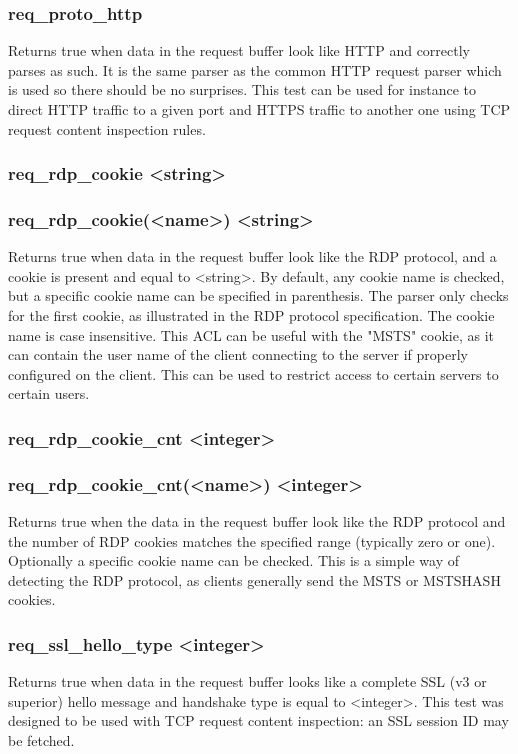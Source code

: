 \subsubsection{req\_proto\_http}
  Returns true when data in the request buffer look like HTTP and correctly
  parses as such. It is the same parser as the common HTTP request parser which
  is used so there should be no surprises. This test can be used for instance
  to direct HTTP traffic to a given port and HTTPS traffic to another one
  using TCP request content inspection rules.

\subsubsection[req\_rdp\_cookie]{req\_rdp\_cookie <string>}
\subsubsection*{req\_rdp\_cookie(<name>) <string>}
  Returns true when data in the request buffer look like the RDP protocol, and
  a cookie is present and equal to <string>. By default, any cookie name is
  checked, but a specific cookie name can be specified in parenthesis. The
  parser only checks for the first cookie, as illustrated in the RDP protocol
  specification. The cookie name is case insensitive. This ACL can be useful
  with the "MSTS" cookie, as it can contain the user name of the client
  connecting to the server if properly configured on the client. This can be
  used to restrict access to certain servers to certain users.

\subsubsection[req\_rdp\_cookie\_cnt]{req\_rdp\_cookie\_cnt <integer>}
\subsubsection*{req\_rdp\_cookie\_cnt(<name>) <integer>}
  Returns true when the data in the request buffer look like the RDP protocol
  and the number of RDP cookies matches the specified range (typically zero or
  one). Optionally a specific cookie name can be checked. This is a simple way
  of detecting the RDP protocol, as clients generally send the MSTS or MSTSHASH
  cookies.

\subsubsection[req\_ssl\_hello\_type]{req\_ssl\_hello\_type <integer>}
  Returns true when data in the request buffer looks like a complete SSL (v3
  or superior) hello message and handshake type is equal to <integer>.
  This test was designed to be used with TCP request content inspection: an
  SSL session ID may be fetched.

